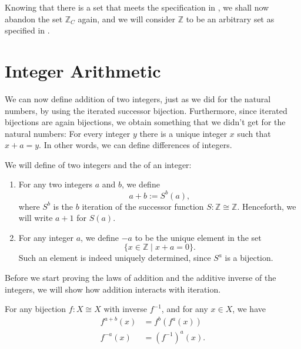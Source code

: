 Knowing that there is a set that meets the specification in , we shall now abandon the set $\mathbb{Z}_C$ again, and we will consider $\mathbb{Z}$ to be an arbitrary set as specified in .

\section{Integer Arithmetic}\label{section:integer-arithmetic}

We can now define addition of two integers, just as we did for the natural numbers, by using the iterated successor bijection. Furthermore, since iterated bijections are again bijections, we obtain something that we didn't get for the natural numbers: For every integer $y$ there is a unique integer $x$ such that $x+a=y$. In other words, we can define differences of integers.

\begin{definition}
  We will define  of two integers and the  of an integer:
  \begin{enumerate}
  \item For any two integers $a$ and $b$, we define
  \begin{equation*}
    a+b :=S^b(a),
  \end{equation*}
  where $S^b$ is the $b$\supth{} iteration of the successor function $S:\mathbb{Z}\cong\mathbb{Z}$. Henceforth, we will write $a+1$ for $S(a)$.
\item For any integer $a$, we define $-a$ to be the unique element in the set
  \begin{equation*}
    \{x\in\mathbb{Z}\mid x+a=0\}.
  \end{equation*}
  Such an element is indeed uniquely determined, since $S^a$ is a bijection.
  \end{enumerate}
\end{definition}

Before we start proving the laws of addition and the additive inverse of the integers, we will show how addition interacts with iteration.

\begin{theorem}
  For any bijection $f:X\cong X$ with inverse $f^{-1}$, and for any $x\in X$, we have
  \begin{align*}
    f^{a+b}(x) & =f^b(f^a(x)) \\
    f^{-a}(x) & = (f^{-1})^a(x).
  \end{align*}
\end{theorem}

